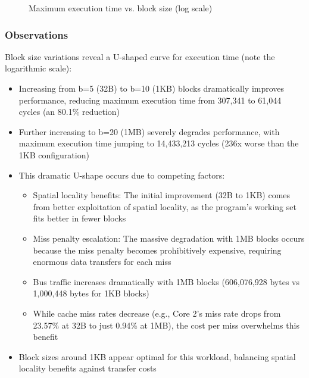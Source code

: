 \documentclass[11pt,a4paper]{article}
\begin{document}
\begin{itemize}[leftmargin=*]
\begin{figure}[H]
        \caption{Maximum execution time vs. block size (log scale)}
        \label{fig:block_size}
    \end{figure}

    \subsubsection{Observations}
    Block size variations reveal a U-shaped curve for execution time (note the logarithmic scale):
    \begin{itemize}[leftmargin=*]
        \item Increasing from b=5 (32B) to b=10 (1KB) blocks dramatically improves performance, reducing maximum execution time from 307,341 to 61,044 cycles (an 80.1\% reduction)
        \item Further increasing to b=20 (1MB) severely degrades performance, with maximum execution time jumping to 14,433,213 cycles (236x worse than the 1KB configuration)
        \item This dramatic U-shape occurs due to competing factors:
        \begin{itemize}
            \item Spatial locality benefits: The initial improvement (32B to 1KB) comes from better exploitation of spatial locality, as the program's working set fits better in fewer blocks
            \item Miss penalty escalation: The massive degradation with 1MB blocks occurs because the miss penalty becomes prohibitively expensive, requiring enormous data transfers for each miss
            \item Bus traffic increases dramatically with 1MB blocks (606,076,928 bytes vs 1,000,448 bytes for 1KB blocks)
            \item While cache miss rates decrease (e.g., Core 2's miss rate drops from 23.57\% at 32B to just 0.94\% at 1MB), the cost per miss overwhelms this benefit
        \end{itemize}
        \item Block sizes around 1KB appear optimal for this workload, balancing spatial locality benefits against transfer costs
    \end{itemize}


\end{itemize}
\end{document}
